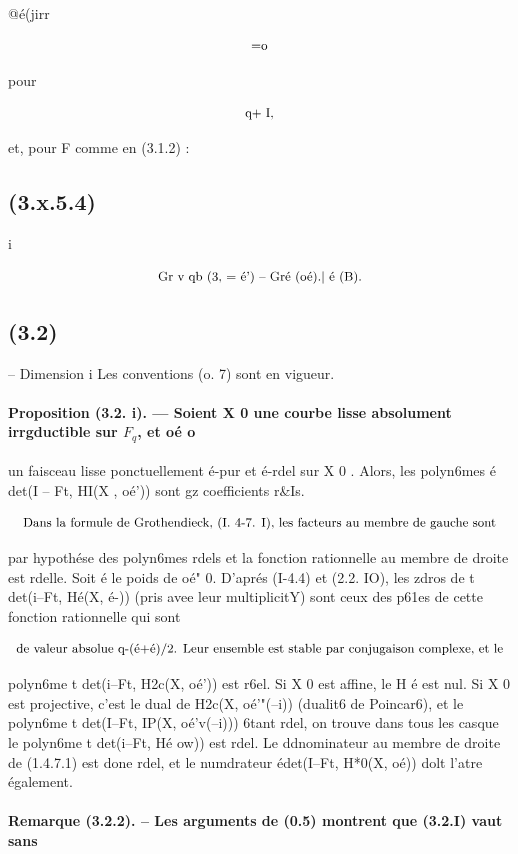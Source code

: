 \documentclass[11pt]{article}
\theoremstyle{remark}
\begin{document}
@é(jirr

\[\text{\small =o}\]

pour

\[\text{\small q+ I,}\]

et, pour F comme en (3.1.2) :

\subsection*{(3.x.5.4)}

i

\[\text{\small Gr v qb (3, = é') -- Gré (oé).| é (B).}\]

\subsection*{(3.2)}

-- Dimension i Les conventions (o. 7) sont en vigueur.

\paragraph{Proposition (3.2. i). --- Soient X 0 une courbe lisse absolument irrgductible sur \(F_q\), et oé o}

un faisceau lisse ponctuellement é-pur et é-rdel sur X 0 . Alors, les polyn6mes é det(I -- Ft, HI(X , oé')) sont gz coefficients r\&Is.

\[\text{\small Dans la formule de Grothendieck, (I. 4-7. I), les facteurs au membre de gauche sont}\]

par hypothése des polyn6mes rdels et la fonction rationnelle au membre de droite est rdelle. Soit é le poids de oé" 0. D'aprés (I-4.4) et (2.2. IO), les zdros de t det(i--Ft, Hé(X, é-)) (pris avee leur multiplicitY) sont ceux des p61es de cette fonction rationnelle qui sont

\[\text{\small de valeur absolue q-(é+é)/2. Leur ensemble est stable par conjugaison complexe, et le}\]

polyn6me t det(i--Ft, H2c(X, oé')) est r6el. Si X 0 est affine, le H é est nul. Si X 0 est projective, c'est le dual de H2c(X, oé'"(--i)) (dualit6 de Poincar6), et le polyn6me t det(I--Ft, IP(X, oé'v(--i))) 6tant rdel, on trouve dans tous les casque le polyn6me t det(i--Ft, Hé ow)) est rdel. Le ddnominateur au membre de droite de (1.4.7.1) est done rdel, et le numdrateur édet(I--Ft, H*0(X, oé)) dolt l'atre également.

\paragraph{Remarque (3.2.2). -- Les arguments de (0.5) montrent que (3.2.I) vaut sans}
\end{document}
